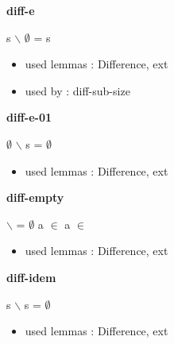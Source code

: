 \documentclass[a4paper]{article}
\begin{document}
\medskip

\bigskip

{\large\bf diff-e}

\medskip

 \Fol s $\backslash$ $\emptyset$ = s

\begin{itemize}


\item       used lemmas  : Difference, ext
\item       used by      : diff-sub-size

\end{itemize}

\medskip

\bigskip

{\large\bf diff-e-01}

\medskip

 \Fol $\emptyset$ $\backslash$ s = $\emptyset$

\begin{itemize}


\item       used lemmas  : Difference, ext

\end{itemize}

\medskip

\bigskip

{\large\bf diff-empty}

\medskip

 \Fol {} $\backslash$  = $\emptyset$ \And a $\in$  \Imp a $\in$ 

\begin{itemize}


\item       used lemmas  : Difference, ext

\end{itemize}

\medskip

\bigskip

{\large\bf diff-idem}

\medskip

 \Fol s $\backslash$ s = $\emptyset$

\begin{itemize}


\item       used lemmas  : Difference, ext

\end{itemize}

\medskip
\end{document}
